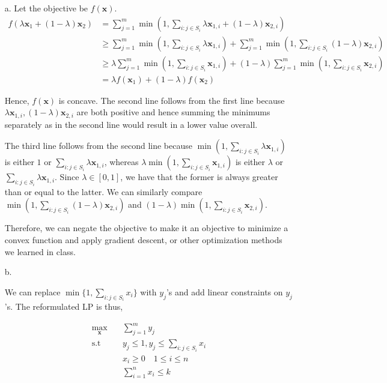 \documentclass[11pt]{article}
\theoremstyle{remark}
\newcommand{\bx}{\mathbf{x}}
\begin{document}
\color{blue}
\begin{itemize}
\item[a.]
Let the objective be $f(\bx)$.
\begin{align*}
f(\lambda \bx_1 + (1-\lambda)\bx_2) &= \sum_{j=1}^m \min(1,\sum_{i:j \in S_i} \lambda \bx_{1,i} + (1-\lambda) \bx_{2,i}) &\\
&\geq \sum_{j=1}^m \min(1,\sum_{i:j \in S_i} \lambda \bx_{1,i}) + \sum_{j=1}^m \min(1,\sum_{i:j \in S_i} (1-\lambda) \bx_{2,i}) &\\
&\geq  \lambda \sum_{j=1}^m \min(1,\sum_{i:j \in S_i} \bx_{1,i}) + (1-\lambda) \sum_{j=1}^m \min(1,\sum_{i:j \in S_i} \bx_{2,i}) &\\
&= \lambda f(\bx_1) + (1-\lambda) f(\bx_2)
\end{align*}

Hence, $f(\bx)$ is concave.
The second line follows from the first line because $ \lambda \bx_{1,i}, (1-\lambda) \bx_{2,i}$ are both positive and hence summing the minimums separately as in the second line would result in a lower value overall.

The third line follows from the second line because $\min(1,\sum_{i:j \in S_i}\lambda \bx_{1,i})$ is either $1$ or $\sum_{i:j \in S_i} \lambda \bx_{1,i}$, whereas $\lambda \min(1,\sum_{i:j \in S_i} \bx_{1,i})$ is either $\lambda$ or $\sum_{i:j \in S_i} \lambda \bx_{1,i}$. Since $\lambda \in [0,1]$, we have that the former is always greater than or equal to the latter. We can similarly compare $\min(1,\sum_{i:j \in S_i} (1-\lambda) \bx_{2,i})$ and $(1-\lambda) \min(1,\sum_{i:j \in S_i} \bx_{2,i})$.

Therefore, we can negate the objective to make it an objective to minimize a convex function and apply gradient descent, or other optimization methods we learned in class.

\item[b.]

We can replace $\min\big\{1,\sum_{i:j\in S_i} x_i\big\}$ with $y_j$'s and add linear constraints on $y_j$'s. The reformulated LP is thus,


        \begin{align*}
            \max_{\bx} & \quad \sum_{j=1}^m y_j \\
            \text{s.t} & \quad y_j \leq 1, y_j \leq \sum_{i:j\in S_i} x_i\\
                       &\quad x_i\geq 0\quad 1\leq i\leq n\\
                       &\quad \sum_{i=1}^n x_i\leq k
        \end{align*}
\end{itemize}
\color{black}
\end{document}
